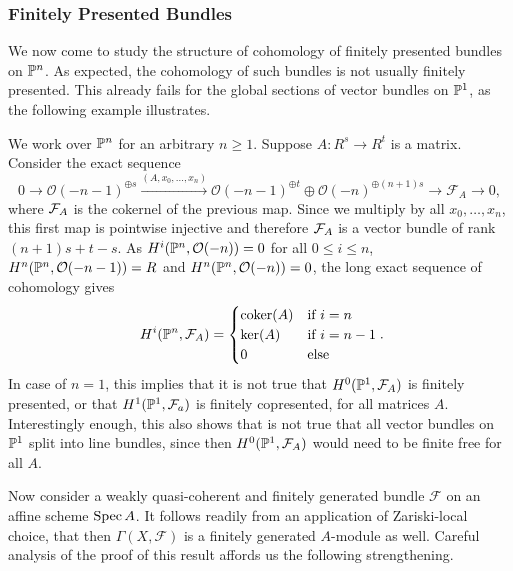 \subsubsection{Finitely Presented Bundles}

We now come to study the structure of cohomology of finitely presented bundles on $\mathbb{P}^n$.
As expected, the cohomology of such bundles is not usually finitely presented.
This already fails for the global sections of vector bundles on $\mathbb{P}^1$, as the following example illustrates.

\begin{example}
  \label{cohomology-of-vectorbundle-prescribed-by-matrix}
  We work over $\mathbb{P}^n$ for an arbitrary $n \geq 1$.
  Suppose $A : R^s \to R^t$ is a matrix.
  Consider the exact sequence
  \[
    0 \longrightarrow \mathcal O(-n-1)^{\oplus s}
    \overset{(A,x_0,\hdots, x_n)}{\longrightarrow} \mathcal O(-n-1)^{\oplus t} \oplus \mathcal O(-n)^{\oplus (n+1)s}
    \longrightarrow \mathcal F_A \longrightarrow 0,
  \]
  where $\mathcal{F}_A$ is the cokernel of the previous map.
  Since we multiply by all $x_0, \hdots, x_n$,  this first map is pointwise injective and therefore $\mathcal{F}_A$ is a vector bundle of rank $(n+1)s + t - s$.
  As $H^i(\mathbb{P}^n, \mathcal{O}(-n)) = 0$ for all $0 \leq i \leq n$, $H^n(\mathbb{P}^n,\mathcal{O}(-n-1)) = R$ and $H^n(\mathbb{P}^n,\mathcal{O}(-n)) = 0$, the long exact sequence of cohomology gives
  \[
    H^i(\bP^n, \mc F_A) = \begin{cases}
      \coker(A) &\mbox{if } i = n \\
      \ker(A)  &\mbox{if } i = n-1 \\
      0        &\mbox{else}
    \end{cases}
    \rlap{.}
  \]
  In case of $n=1$, this implies that it is not true that $H^0(\mathbb{P}^1,\mathcal F_A)$ is finitely presented, or that $H^1(\mathbb{P}^1, \mathcal{F}_a)$ is finitely copresented, for all matrices $A$.
  Interestingly enough, this also shows that is not true that all vector bundles on $\mathbb{P}^1$ split into line bundles, since then $H^0(\mathbb{P}^1, \mathcal F_A)$ would need to be finite free for all $A$.
\end{example}

Now consider a weakly quasi-coherent and finitely generated bundle $\mathcal F$ on an affine scheme $\operatorname{Spec} A$.
It follows readily from an application of Zariski-local choice, that then $\Gamma (X,\mathcal F)$ is a finitely generated $A$-module as well.
Careful analysis of the proof of this result affords us the following strengthening.

